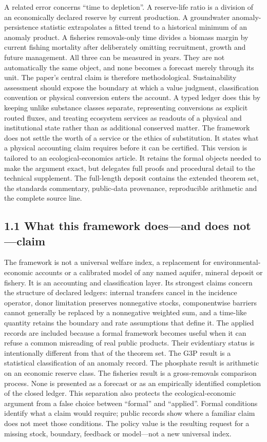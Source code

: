 \documentclass[11pt]{article}
\begin{document}
A related error concerns ``time to depletion''. A reserve-life ratio is a division of an economically declared reserve by current production. A groundwater anomaly-persistence statistic extrapolates a fitted trend to a historical minimum of an anomaly product. A fisheries removals-only time divides a biomass margin by current fishing mortality after deliberately omitting recruitment, growth and future management. All three can be measured in years. They are not automatically the same object, and none becomes a forecast merely through its unit.
The paper's central claim is therefore methodological. Sustainability assessment should expose the boundary at which a value judgment, classification convention or physical conversion enters the account. A typed ledger does this by keeping unlike substance classes separate, representing conversions as explicit routed fluxes, and treating ecosystem services as readouts of a physical and institutional state rather than as additional conserved matter. The framework does not settle the worth of a service or the ethics of substitution. It states what a physical accounting claim requires before it can be certified.
This version is tailored to an ecological-economics article. It retains the formal objects needed to make the argument exact, but delegates full proofs and procedural detail to the technical supplement. The full-length deposit contains the extended theorem set, the standards commentary, public-data provenance, reproducible arithmetic and the complete source line.
\subsection{1.1 What this framework does---and does not---claim}
The framework is not a universal welfare index, a replacement for environmental-economic accounts or a calibrated model of any named aquifer, mineral deposit or fishery. It is an accounting and classification layer. Its strongest claims concern the structure of declared ledgers: internal transfers cancel in the incidence operator, donor limitation preserves nonnegative stocks, componentwise barriers cannot generally be replaced by a nonnegative weighted sum, and a time-like quantity retains the boundary and rate assumptions that define it.
The applied records are included because a formal framework becomes useful when it can refuse a common misreading of real public products. Their evidentiary status is intentionally different from that of the theorem set. The G3P result is a statistical classification of an anomaly record. The phosphate result is arithmetic on an economic reserve class. The fisheries result is a gross-removals comparison process. None is presented as a forecast or as an empirically identified completion of the closed ledger.
This separation also protects the ecological-economic argument from a false choice between ``formal'' and ``applied''. Formal conditions identify what a claim would require; public records show where a familiar claim does not meet those conditions. The policy value is the resulting request for a missing stock, boundary, feedback or model---not a new universal index.
\end{document}
